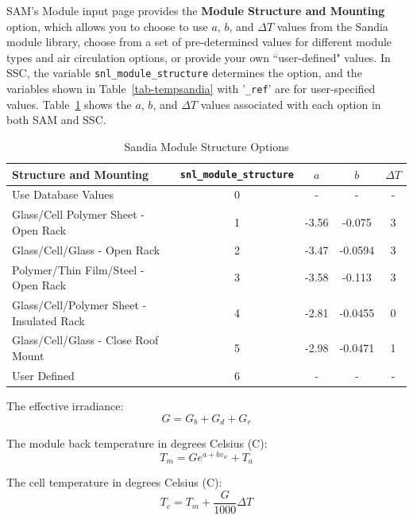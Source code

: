 \documentclass[12pt,letterpaper]{article}
\begin{document}
SAM's Module input page provides the \textbf{Module Structure and Mounting} option, which allows you to choose to use $a$, $b$, and $\Delta T$ values from the Sandia module library, choose from a set of pre-determined values for different module types and air circulation options, or provide your own ``user-defined" values. In SSC, the variable \texttt{snl\_module\_structure} determines the option, and the variables shown in Table~\ref{tab-tempsandia} with '\texttt{\_ref}' are for user-specified values. Table~\ref{tab-sandiamodstruct} shows the $a$, $b$, and $\Delta T$ values associated with each option in both SAM and SSC.

\begin{table}
\begin{center}
\caption{Sandia Module Structure Options}
\begin{tabular}{lcccc}
\midrule
Structure and Mounting & \texttt{snl\_module\_structure} & $a$ & $b$ & $\Delta T$ \\
\midrule
Use Database Values & 0 & - & - & - \\
Glass/Cell Polymer Sheet - Open Rack & 1 & -3.56 & -0.075 & 3 \\
Glass/Cell/Glass - Open Rack & 2 & -3.47 & -0.0594 & 3 \\
Polymer/Thin Film/Steel - Open Rack & 3 & -3.58 & -0.113 & 3 \\
Glass/Cell/Polymer Sheet - Insulated Rack & 4 & -2.81 & -0.0455 & 0 \\
Glass/Cell/Glass - Close Roof Mount & 5 & -2.98 & -0.0471 & 1 \\
User Defined & 6 & - & - & - \\
\hline
\end{tabular}
\label{tab-sandiamodstruct}
\end{center}
\end{table}

The effective irradiance:
\begin{equation}
G = G_b + G_d + G_r
\end{equation}

The module back temperature in degrees Celsius (\degree C):
\begin{equation}
T_m = G e^{a+b v_w} + T_a
\end{equation}

The cell temperature in degrees Celsius (\degree C):
\begin{equation}\label{eqn-sandiatemp}
T_c = T_m + \frac{G}{1000}  \Delta T
\end{equation}
\end{document}
